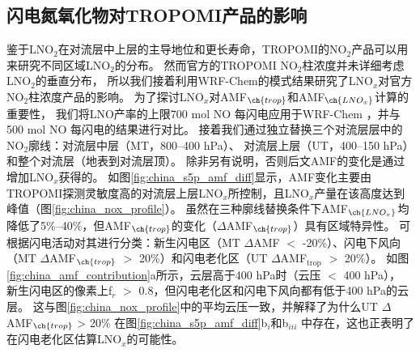 \subsection{闪电氮氧化物对TROPOMI产品的影响}  \label{sec:lnox_affects_tropomi}

鉴于LNO$_2$在对流层中上层的主导地位和更长寿命，TROPOMI的NO$_2$产品可以用来研究不同区域LNO$_2$的分布。
然而官方的TROPOMI NO$_2$柱浓度并未详细考虑LNO$_2$的垂直分布，
所以我们接着利用WRF-Chem的模式结果研究了LNO$_x$对官方NO$_2$柱浓度产品的影响。
为了探讨LNO$_x$对AMF$_{\ch{trop}}$和AMF$_{\ch{LNO_x}}$计算的重要性，
我们将LNO产率的上限700 mol NO 每闪电\citep{Ott.2010}应用于WRF-Chem ，并与500 mol NO 每闪电的结果进行对比。
接着我们通过独立替换三个对流层层中的NO$_2$廓线：对流层中层（MT，800--400 hPa）、
对流层上层（UT，400--150 hPa）和整个对流层（地表到对流层顶）。
除非另有说明，否则后文AMF的变化是通过增加LNO$_x$获得的。
如图\ref{fig:china_s5p_amf_diff}显示，AMF变化主要由TROPOMI探测灵敏度高的对流层上层LNO$_x$所控制\citep{Beirle.2009,Laughner.2017}，且LNO$_x$产量在该高度达到峰值（图\ref{fig:china_nox_profile}）。
虽然在三种廓线替换条件下AMF$_{\ch{LNO_x}}$均降低了5\%--40\%，但AMF$_{\ch{trop}}$的变化（$\Delta$AMF$_{\ch{trop}}$）具有区域特异性。
可根据闪电活动对其进行分类：新生闪电区（MT $\Delta$AMF $<$ -20\%）、闪电下风向（MT $\Delta$AMF$_{\ch{trop}}$ $>$ 20\%）和闪电老化区（UT $\Delta$AMF$_\textrm{trop}$ $>$ 20\%）。
如图\ref{fig:china_amf_contribution}a所示，云层高于400 hPa时（云压 $<$ 400 hPa），
新生闪电区的像素上f$_r$ $>$ 0.8，但闪电老化区和闪电下风向都有低于400 hPa的云层。
这与图\ref{fig:china_nox_profile}中的平均云压一致，并解释了为什么UT $\Delta$AMF$_{\ch{trop}}$ > 20\% 在图\ref{fig:china_s5p_amf_diff}b$_i$和b$_{iii}$ 中存在，这也正表明了在闪电老化区估算LNO$_x$的可能性。


